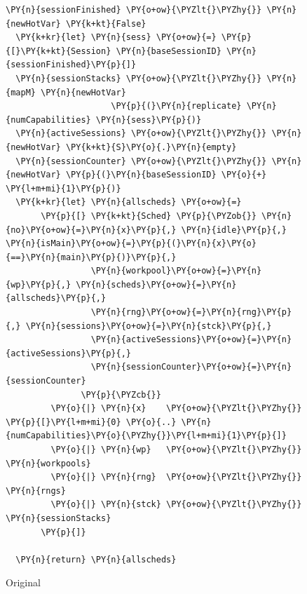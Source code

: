 \begin{figure}[t]
\begin{minipage}[t]{0.49\textwidth}
\begin{Verbatim}[commandchars=\\\{\}]
  \PY{n}{sessionFinished} \PY{o+ow}{\PYZlt{}\PYZhy{}} \PY{n}{newHotVar} \PY{k+kt}{False}
  \PY{k+kr}{let} \PY{n}{sess} \PY{o+ow}{=} \PY{p}{[}\PY{k+kt}{Session} \PY{n}{baseSessionID} \PY{n}{sessionFinished}\PY{p}{]}
  \PY{n}{sessionStacks} \PY{o+ow}{\PYZlt{}\PYZhy{}} \PY{n}{mapM} \PY{n}{newHotVar}
                     \PY{p}{(}\PY{n}{replicate} \PY{n}{numCapabilities} \PY{n}{sess}\PY{p}{)}
  \PY{n}{activeSessions} \PY{o+ow}{\PYZlt{}\PYZhy{}} \PY{n}{newHotVar} \PY{k+kt}{S}\PY{o}{.}\PY{n}{empty}
  \PY{n}{sessionCounter} \PY{o+ow}{\PYZlt{}\PYZhy{}} \PY{n}{newHotVar} \PY{p}{(}\PY{n}{baseSessionID} \PY{o}{+} \PY{l+m+mi}{1}\PY{p}{)}
  \PY{k+kr}{let} \PY{n}{allscheds} \PY{o+ow}{=}
       \PY{p}{[} \PY{k+kt}{Sched} \PY{p}{\PYZob{}} \PY{n}{no}\PY{o+ow}{=}\PY{n}{x}\PY{p}{,} \PY{n}{idle}\PY{p}{,} \PY{n}{isMain}\PY{o+ow}{=}\PY{p}{(}\PY{n}{x}\PY{o}{==}\PY{n}{main}\PY{p}{)}\PY{p}{,}
                 \PY{n}{workpool}\PY{o+ow}{=}\PY{n}{wp}\PY{p}{,} \PY{n}{scheds}\PY{o+ow}{=}\PY{n}{allscheds}\PY{p}{,}
                 \PY{n}{rng}\PY{o+ow}{=}\PY{n}{rng}\PY{p}{,} \PY{n}{sessions}\PY{o+ow}{=}\PY{n}{stck}\PY{p}{,}
                 \PY{n}{activeSessions}\PY{o+ow}{=}\PY{n}{activeSessions}\PY{p}{,}
                 \PY{n}{sessionCounter}\PY{o+ow}{=}\PY{n}{sessionCounter}
               \PY{p}{\PYZcb{}}
         \PY{o}{|} \PY{n}{x}    \PY{o+ow}{\PYZlt{}\PYZhy{}} \PY{p}{[}\PY{l+m+mi}{0} \PY{o}{..} \PY{n}{numCapabilities}\PY{o}{\PYZhy{}}\PY{l+m+mi}{1}\PY{p}{]}
         \PY{o}{|} \PY{n}{wp}   \PY{o+ow}{\PYZlt{}\PYZhy{}} \PY{n}{workpools}
         \PY{o}{|} \PY{n}{rng}  \PY{o+ow}{\PYZlt{}\PYZhy{}} \PY{n}{rngs}
         \PY{o}{|} \PY{n}{stck} \PY{o+ow}{\PYZlt{}\PYZhy{}} \PY{n}{sessionStacks}
       \PY{p}{]}

  \PY{n}{return} \PY{n}{allscheds}
\end{Verbatim}
    \caption*{Original}
  \end{minipage}
  \begin{minipage}[t]{0.49\textwidth}



\end{minipage}
\end{figure}
